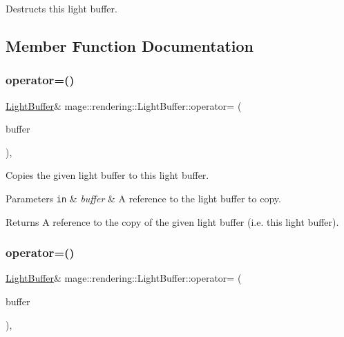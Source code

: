 Destructs this light buffer. 

\subsection{Member Function Documentation}
\mbox{\label{structmage_1_1rendering_1_1_light_buffer_a409af50e3d21571e56b36c6c88769a65}} 
\subsubsection{\texorpdfstring{operator=()}{operator=()}\hspace{0.1cm}{\footnotesize\ttfamily [1/2]}}
{\footnotesize\ttfamily \mbox{\hyperlink{structmage_1_1rendering_1_1_light_buffer}{Light\+Buffer}}\& mage\+::rendering\+::\+Light\+Buffer\+::operator= (\begin{DoxyParamCaption}\item[{const \mbox{\hyperlink{structmage_1_1rendering_1_1_light_buffer}{Light\+Buffer}} \&}]{buffer }\end{DoxyParamCaption})\hspace{0.3cm}{\ttfamily [default]}, {\ttfamily [noexcept]}}

Copies the given light buffer to this light buffer.


\begin{DoxyParams}[1]{Parameters}
\mbox{\tt in}  & {\em buffer} & A reference to the light buffer to copy. \\
\hline
\end{DoxyParams}
\begin{DoxyReturn}{Returns}
A reference to the copy of the given light buffer (i.\+e. this light buffer). 
\end{DoxyReturn}
\mbox{\label{structmage_1_1rendering_1_1_light_buffer_abe8ee3df1e5c2ce28aaab03ce729a184}} 
\subsubsection{\texorpdfstring{operator=()}{operator=()}\hspace{0.1cm}{\footnotesize\ttfamily [2/2]}}
{\footnotesize\ttfamily \mbox{\hyperlink{structmage_1_1rendering_1_1_light_buffer}{Light\+Buffer}}\& mage\+::rendering\+::\+Light\+Buffer\+::operator= (\begin{DoxyParamCaption}\item[{\mbox{\hyperlink{structmage_1_1rendering_1_1_light_buffer}{Light\+Buffer}} \&\&}]{buffer }\end{DoxyParamCaption})\hspace{0.3cm}{\ttfamily [default]}, {\ttfamily [noexcept]}}

